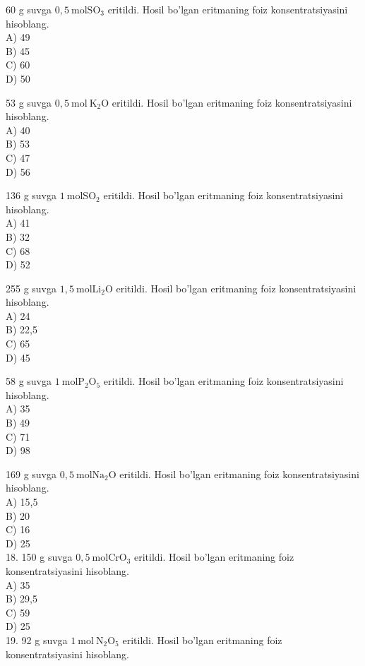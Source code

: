   \item 60 g suvga $0,5 \mathrm{~mol} \mathrm{SO}_{3}$ eritildi. Hosil bo'lgan eritmaning foiz konsentratsiyasini hisoblang.\\
A) 49\\
B) 45\\
C) 60\\
D) 50
  \item 53 g suvga $0,5 \mathrm{~mol} \mathrm{~K}_{2} \mathrm{O}$ eritildi. Hosil bo'lgan eritmaning foiz konsentratsiyasini hisoblang.\\
A) 40\\
B) 53\\
C) 47\\
D) 56
  \item 136 g suvga $1 \mathrm{~mol} \mathrm{SO}_{2}$ eritildi. Hosil bo'lgan eritmaning foiz konsentratsiyasini hisoblang.\\
A) 41\\
B) 32\\
C) 68\\
D) 52
  \item 255 g suvga $1,5 \mathrm{~mol} \mathrm{Li}_{2} \mathrm{O}$ eritildi. Hosil bo'lgan eritmaning foiz konsentratsiyasini hisoblang.\\
A) 24\\
B) 22,5\\
C) 65\\
D) 45
  \item 58 g suvga $1 \mathrm{~mol} \mathrm{P}_{2} \mathrm{O}_{5}$ eritildi. Hosil bo'lgan eritmaning foiz konsentratsiyasini hisoblang.\\
A) 35\\
B) 49\\
C) 71\\
D) 98
  \item 169 g suvga $0,5 \mathrm{~mol} \mathrm{Na}_{2} \mathrm{O}$ eritildi.
Hosil bo'lgan eritmaning foiz konsentratsiyasini hisoblang.\\
A) 15,5\\
B) 20\\
C) 16\\
D) 25\\
18. 150 g suvga $0,5 \mathrm{~mol} \mathrm{CrO}_{3}$ eritildi. Hosil bo'lgan eritmaning foiz konsentratsiyasini hisoblang.\\
A) 35\\
B) 29,5\\
C) 59\\
D) 25\\
19. 92 g suvga $1 \mathrm{~mol} \mathrm{~N}_{2} \mathrm{O}_{5}$ eritildi. Hosil bo'lgan eritmaning foiz konsentratsiyasini hisoblang.\\
